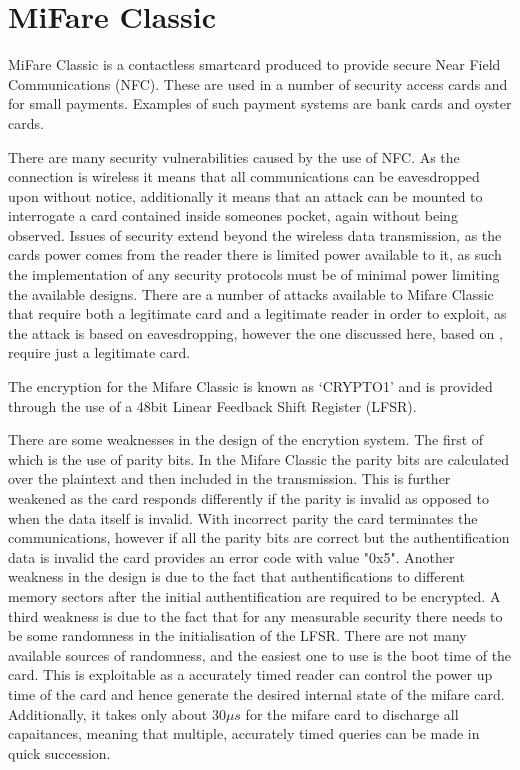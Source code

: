\section{MiFare Classic}

MiFare Classic is a contactless smartcard produced to provide secure Near Field Communications (NFC).
These are used in a number of security access cards and for small payments.
Examples of such payment systems are bank cards and oyster cards.

There are many security vulnerabilities caused by the use of NFC.
As the connection is wireless it means that all communications can be eavesdropped upon without notice, additionally it means that an attack can be mounted to interrogate a card contained inside someones pocket, again without being observed.
Issues of security extend beyond the wireless data transmission, as the cards power comes from the reader there is limited power available to it, as such the implementation of any security protocols must be of minimal power limiting the available designs.
There are a number of attacks available to Mifare Classic that require both a legitimate card and a legitimate reader in order to exploit, as the attack is based on eavesdropping, however the one discussed here, based on \cite{WirelessPickpocket}, require just a legitimate card.

The encryption for the Mifare Classic is known as `CRYPTO1' and is provided through the use of a 48bit Linear Feedback Shift Register (LFSR).

There are some weaknesses in the design of the encrytion system.
The first of which is the use of parity bits.
In the Mifare Classic the parity bits are calculated over the plaintext and then included in the transmission.
This is further weakened as the card responds differently if the parity is invalid as opposed to when the data itself is invalid.
With incorrect parity the card terminates the communications, however if all the parity bits are correct but the authentification data is invalid the card provides an error code with value "0x5".
Another weakness in the design is due to the fact that authentifications to different memory sectors after the initial authentification are required to be encrypted.
A third weakness is due to the fact that for any measurable security there needs to be some randomness in the initialisation of the LFSR.
There are not many available sources of randomness, and the easiest one to use is the boot time of the card.
This is exploitable as a accurately timed reader can control the power up time of the card and hence generate the desired internal state of the mifare card.
Additionally, it takes only about $30\mu s$ for the mifare card to discharge all capaitances, meaning that multiple, accurately timed queries can be made in quick succession.


